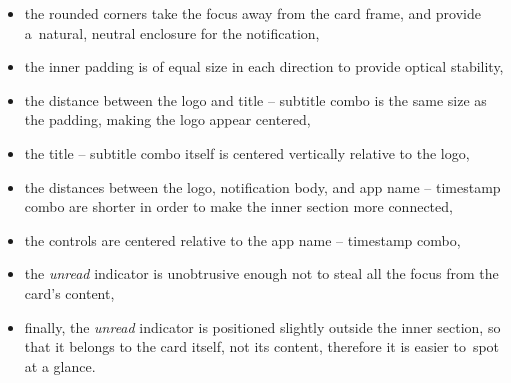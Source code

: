 \begin{itemize}
      \item
            the rounded corners take the focus away from the card frame,
            and provide a~natural, neutral enclosure for the notification,
      \item
            the inner padding is of equal size in each direction
            to provide optical stability,
      \item
            the distance between the logo and title -- subtitle combo
            is the same size as the padding,
            making the logo appear centered,
      \item
            the title -- subtitle combo itself
            is centered vertically relative to the logo,
      \item
            the distances between the logo,
            notification body, and app name -- timestamp combo are shorter
            in order to make the inner section more connected,
      \item
            the controls are centered relative to the app name -- timestamp combo,
      \item
            the \textit{unread} indicator is unobtrusive enough
            not to steal all the focus from the card's content,
      \item
            finally, the \textit{unread} indicator
            is positioned slightly outside the inner section,
            so that it belongs to the card itself,
            not its content,
            therefore it is easier to~spot at a glance.
\end{itemize}

